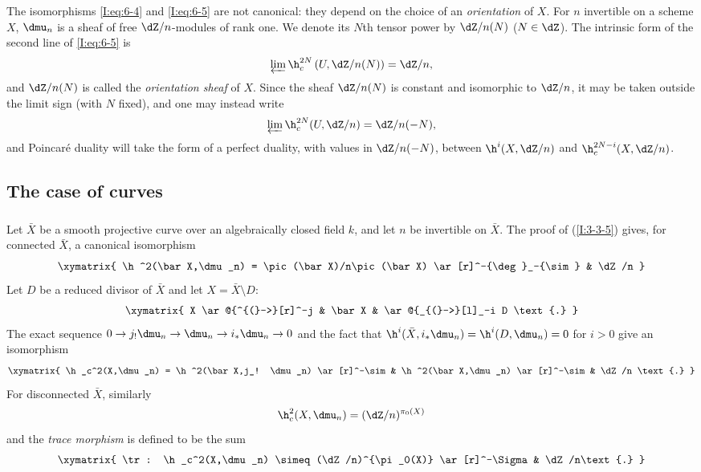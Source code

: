 \documentclass[oneside]{book}
\begin{document}
The isomorphisms \eqref{I:eq:6-4} and \eqref{I:eq:6-5} are not
canonical: they depend on the choice of an \emph{orientation} of $X$.
For $n$ invertible on a scheme $X$, $\dmu_n$ is a sheaf of free
$\dZ/n$-modules of rank one. We denote its $N$th tensor power by
$\dZ/n(N)$ ($N\in\dZ$). The intrinsic form of the second line of
\eqref{I:eq:6-5} is
\begin{equation}\label{I:eq:6-5'}
  \varprojlim \h_c^{2N} \left(U,\dZ/n(N)\right) = \dZ/n \text{,}
\end{equation}
and $\dZ/n(N)$ is called the \emph{orientation sheaf} of $X$. Since the
sheaf $\dZ/n(N)$ is constant and isomorphic to $\dZ/n$, it may be taken
outside the limit sign (with $N$ fixed), and one may instead write
\begin{equation}\label{I:eq:6-5''}
  \varprojlim \h_c^{2N} (U,\dZ/n) = \dZ/n(-N) \text{,}
\end{equation}
and Poincaré duality will take the form of a perfect duality, with values
in $\dZ/n(-N)$, between $\h^i(X,\dZ/n)$ and
$\h_c^{2N-i}(X,\dZ/n)$.

\subsection{The case of curves}\label{I:6-2}

\subsubsection{}\label{I:6-2-1}

Let $\bar X$ be a smooth projective curve over an algebraically closed
field $k$, and let $n$ be invertible on $\bar X$. The proof of
(\ref{I:3-3-5}) gives, for connected $\bar X$, a canonical isomorphism
\[\xymatrix{
  \h^2(\bar X,\dmu_n) = \pic(\bar X)/n\pic(\bar X) \ar[r]^-{\deg}_-{\sim}
    & \dZ/n
}\]
Let $D$ be a reduced divisor of $\bar X$ and let
$X=\bar X\setminus D$:
\[\xymatrix{
  X \ar@{^{(}->}[r]^-j
    & \bar X
    & \ar@{_{(}->}[l]_-i D \text{.}
}\]
The exact sequence
$0\to j_!\dmu_n\to\dmu_n\to i_*\dmu_n\to0$ and the fact that
$\h^i(\bar X,i_*\dmu_n)=\h^i(D,\dmu_n)=0$ for $i>0$ give an
isomorphism
\[\xymatrix{
  \h_c^2(X,\dmu_n) = \h^2(\bar X,j_! \dmu_n) \ar[r]^-\sim
    & \h^2(\bar X,\dmu_n) \ar[r]^-\sim
    & \dZ/n \text{.}
}\]
For disconnected $\bar X$, similarly
\[
  \h_c^2(X,\dmu_n) = (\dZ/n)^{\pi_0(X)}
\]
and the \emph{trace morphism} is defined to be the sum
\[\xymatrix{
  \tr : \h_c^2(X,\dmu_n) \simeq (\dZ/n)^{\pi_0(X)} \ar[r]^-\Sigma
    & \dZ/n\text{.}
}\]
\end{document}
